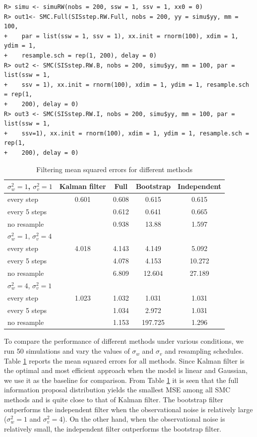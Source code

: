 \begin{verbatim}
R> simu <- simuRW(nobs = 200, ssw = 1, ssv = 1, xx0 = 0)
R> out1<- SMC.Full(SISstep.RW.Full, nobs = 200, yy = simu$yy, mm = 100,
+    par = list(ssw = 1, ssv = 1), xx.init = rnorm(100), xdim = 1, ydim = 1,
+    resample.sch = rep(1, 200), delay = 0)
R> out2 <- SMC(SISstep.RW.B, nobs = 200, simu$yy, mm = 100, par = list(ssw = 1,
+    ssv = 1), xx.init = rnorm(100), xdim = 1, ydim = 1, resample.sch = rep(1,
+    200), delay = 0)
R> out3 <- SMC(SISstep.RW.I, nobs = 200, simu$yy, mm = 100, par = list(ssw = 1,
+    ssv=1), xx.init = rnorm(100), xdim = 1, ydim = 1, resample.sch = rep(1,
+    200), delay = 0)
\end{verbatim}



\begin{table}[h]
\begin{center}
\caption{Filtering mean squared errors for different methods}
\begin{tabular}{l| c| ccc}\hline
$\sigma_w^2=1$, $\sigma_v^2=1$	&Kalman filter	&Full &Bootstrap	&Independent\\ \hline
every step		&0.601	&0.608	&0.615   &0.615	\\
every 5 steps	&		    &0.612	&0.641	  &0.665\\
no resample	  &		    &0.938	&13.88	  &1.597\\ \hline
$\sigma_w^2=1$, $\sigma_v^2=4$ &&&&\\ \hline
every step		&4.018	&4.143	&4.149	  &5.092\\
every 5 steps	&		    &4.078	&4.153	  &10.272\\
no resample	  &		    &6.809	&12.604	  &27.189\\ \hline
$\sigma_w^2=4$, $\sigma_v^2=1$ &&&&\\ \hline
every step		&1.023	&1.032	&1.031		  &1.031\\
every 5 steps	&		    &1.034	&2.972		  &1.031\\
no resample	  &		    &1.153	&197.725		&1.296\\ \hline
\end{tabular}\label{tbl:SMC}
\end{center}
\end{table}


To compare the performance of different methods under various conditions, we run 50 simulations and vary the values of $\sigma_w$ and $\sigma_v$ and resampling schedules. Table \ref{tbl:SMC} reports the mean squared errors for all methods. Since Kalman filter is the optimal and most efficient approach when the model is linear and Gaussian, we use it as the baseline for comparison. From Table \ref{tbl:SMC} it is seen that
the full information proposal distribution yields the smallest MSE among all SMC methods and is quite close to that of Kalman filter. The bootstrap filter outperforms the independent filter when the observational noise is relatively large ($\sigma_w^2=1$ and $\sigma_v^2=4$). On the other hand, when the observational noise is relatively small, the independent filter outperforms the bootstrap filter.


